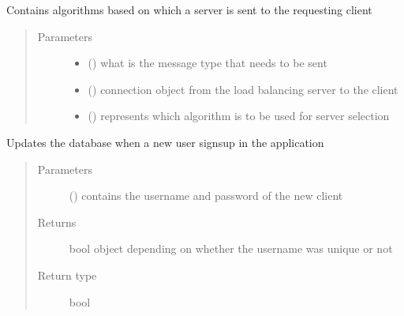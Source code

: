 \documentclass[letterpaper,10pt,english]{sphinxmanual}
\begin{document}

\begin{fulllineitems}
\label{\detokenize{main_server:main_server.return_a_server}}
Contains algorithms based on which a server is sent to the requesting client
\begin{quote}\begin{description}
\item[{Parameters}] \leavevmode\begin{itemize}
\item {} 
 () \textendash{} what is the message type that needs to be sent

\item {} 
 () \textendash{} connection object from the load balancing server to the client

\item {} 
 () \textendash{} represents which algorithm is to be used for server selection

\end{itemize}

\end{description}\end{quote}

\end{fulllineitems}


\begin{fulllineitems}
\label{\detokenize{main_server:main_server.signuppage}}
Updates the database when a new user signsup in the application
\begin{quote}\begin{description}
\item[{Parameters}] \leavevmode
{} () \textendash{} contains the username and password of the new client

\item[{Returns}] \leavevmode
bool object depending on whether the username was unique or not

\item[{Return type}] \leavevmode
bool

\end{description}\end{quote}

\end{fulllineitems}
\end{document}
